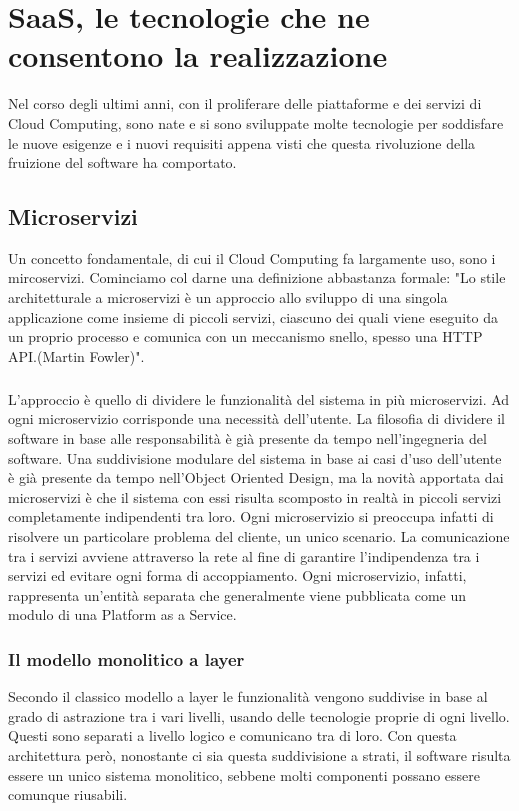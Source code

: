 \chapter{SaaS, le tecnologie che ne consentono la realizzazione}
Nel corso degli ultimi anni, con il proliferare delle piattaforme e dei servizi di Cloud Computing, sono nate e si sono sviluppate molte tecnologie per soddisfare le nuove esigenze e i nuovi requisiti appena visti che questa rivoluzione della fruizione del software ha comportato.

\section{Microservizi}
Un concetto fondamentale, di cui il Cloud Computing fa largamente uso, sono i mircoservizi. Cominciamo col darne una definizione abbastanza formale: "Lo stile architetturale a microservizi è un approccio allo sviluppo di una singola applicazione come insieme di piccoli servizi, ciascuno dei quali viene eseguito da un proprio processo e comunica con un meccanismo snello, spesso una HTTP API.(Martin Fowler)".

\paragraph{}
L'approccio è quello di dividere le funzionalità del sistema in più microservizi. Ad ogni microservizio corrisponde una necessità dell'utente. La filosofia di dividere il software in base alle responsabilità è già presente da tempo nell'ingegneria del software. Una suddivisione modulare del sistema in base ai casi d'uso dell'utente è già presente da tempo nell'Object Oriented Design, ma la novità apportata dai microservizi è che il sistema con essi risulta scomposto in realtà in piccoli servizi completamente indipendenti tra loro. Ogni microservizio si preoccupa infatti di risolvere un particolare problema del cliente, un unico scenario. La comunicazione tra i servizi avviene attraverso la rete al fine di garantire l'indipendenza tra i servizi ed evitare ogni forma di accoppiamento. Ogni microservizio, infatti, rappresenta un'entità separata che generalmente viene pubblicata come un modulo di una Platform as a Service.

\subsection{Il modello monolitico a layer }
Secondo il classico modello a layer le funzionalità vengono suddivise in base al grado di astrazione tra i vari livelli, usando delle tecnologie proprie di ogni livello. Questi sono separati a livello logico e comunicano tra di loro. Con questa architettura però, nonostante ci sia questa suddivisione a strati, il software risulta essere un unico sistema monolitico, sebbene molti componenti possano essere comunque riusabili.


